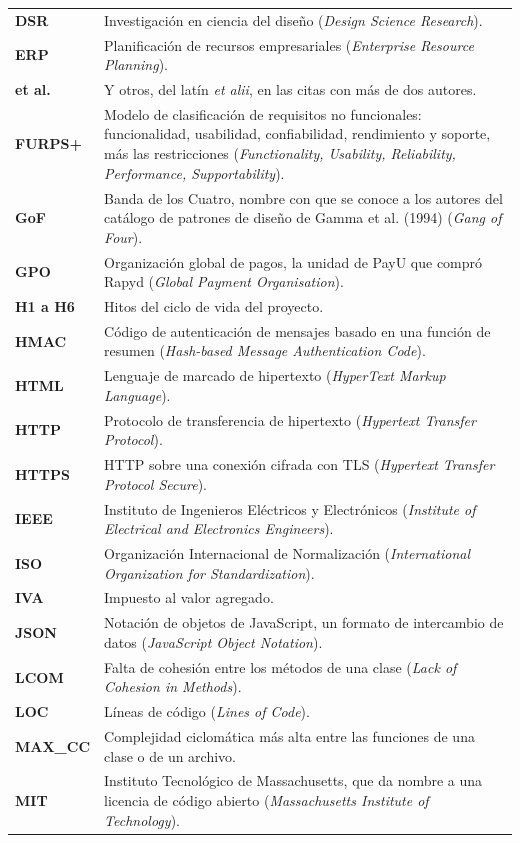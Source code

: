 {\begin{longtable}{@{}>{\bfseries}p{2.4cm}p{12.6cm}@{}}
DSR & Investigación en ciencia del diseño (\textit{Design Science Research}). \\
ERP & Planificación de recursos empresariales (\textit{Enterprise Resource Planning}). \\
et al. & Y otros, del latín \textit{et alii}, en las citas con más de dos autores. \\
FURPS+ & Modelo de clasificación de requisitos no funcionales: funcionalidad, usabilidad, confiabilidad, rendimiento y soporte, más las restricciones (\textit{Functionality, Usability, Reliability, Performance, Supportability}). \\
GoF & Banda de los Cuatro, nombre con que se conoce a los autores del catálogo de patrones de diseño de Gamma et al. (1994) (\textit{Gang of Four}). \\
GPO & Organización global de pagos, la unidad de PayU que compró Rapyd (\textit{Global Payment Organisation}). \\
H1 a H6 & Hitos del ciclo de vida del proyecto. \\
HMAC & Código de autenticación de mensajes basado en una función de resumen (\textit{Hash-based Message Authentication Code}). \\
HTML & Lenguaje de marcado de hipertexto (\textit{HyperText Markup Language}). \\
HTTP & Protocolo de transferencia de hipertexto (\textit{Hypertext Transfer Protocol}). \\
HTTPS & HTTP sobre una conexión cifrada con TLS (\textit{Hypertext Transfer Protocol Secure}). \\
IEEE & Instituto de Ingenieros Eléctricos y Electrónicos (\textit{Institute of Electrical and Electronics Engineers}). \\
ISO & Organización Internacional de Normalización (\textit{International Organization for Standardization}). \\
IVA & Impuesto al valor agregado. \\
JSON & Notación de objetos de JavaScript, un formato de intercambio de datos (\textit{JavaScript Object Notation}). \\
LCOM & Falta de cohesión entre los métodos de una clase (\textit{Lack of Cohesion in Methods}). \\
LOC & Líneas de código (\textit{Lines of Code}). \\
MAX\_CC & Complejidad ciclomática más alta entre las funciones de una clase o de un archivo. \\
MIT & Instituto Tecnológico de Massachusetts, que da nombre a una licencia de código abierto (\textit{Massachusetts Institute of Technology}). \\

\end{longtable}}
